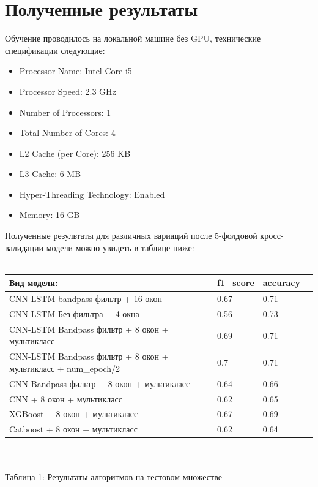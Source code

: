 \documentclass[12pt, a4paper, titlepage]{extreport}
\begin{document}
	\chapter*{Полученные результаты}
	Обучение проводилось на локальной машине без GPU, технические спецификации следующие:\\
	\begin{itemize}
		\item Processor Name: Intel Core i5
		\item Processor Speed: 2.3 GHz
		\item Number of Processors: 1
		\item Total Number of Cores: 4
		\item L2 Cache (per Core): 256 KB
		\item L3 Cache: 6 MB
		\item Hyper-Threading Technology: Enabled
		\item Memory: 16 GB
	\end{itemize}
	Полученные результаты для различных вариаций после 5-фолдовой кросс-валидации модели можно увидеть в таблице ниже:\\
	\\
		\begin{tabular}{|l|l|l|l|}
			\hline
			Вид модели:               & f1\_score & accuracy \\ \hline
			CNN-LSTM bandpass фильтр + 16 окон & 0.67      & 0.71    \\ \hline
			CNN-LSTM Без фильтра + 4 окна      & 0.56      & 0.73    \\ \hline
			CNN-LSTM Bandpass фильтр + 8 окон + мультикласс      & 0.69      & 0.71   \\ \hline
			CNN-LSTM Bandpass фильтр + 8 окон + мультикласс + num\_epoch/2      & 0.7     & 0.71    \\ \hline
			CNN Bandpass фильтр + 8 окон + мультикласс   & 0.64     & 0.66    \\ \hline
			CNN + 8 окон + мультикласс   & 0.62     & 0.65    \\ \hline
			XGBoost + 8 окон + мультикласс   & 0.67     & 0.69    \\ \hline
			Catboost + 8 окон + мультикласс   & 0.62     & 0.64    \\ \hline
		\end{tabular}\\
	\\
	Таблица 1: Результаты алгоритмов на тестовом множестве\\
\end{document}
